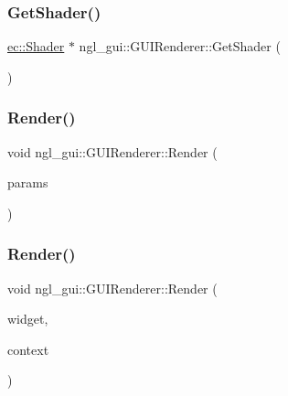 \subsubsection{\texorpdfstring{Get\+Shader()}{GetShader()}}
{\footnotesize\ttfamily \mbox{\hyperlink{classec_1_1_shader}{ec\+::\+Shader}} $\ast$ ngl\+\_\+gui\+::\+G\+U\+I\+Renderer\+::\+Get\+Shader (\begin{DoxyParamCaption}{ }\end{DoxyParamCaption})}

\mbox{\label{classngl__gui_1_1_g_u_i_renderer_a616aa4e5bc587896848b2523686824a7}} 
\subsubsection{\texorpdfstring{Render()}{Render()}\hspace{0.1cm}{\footnotesize\ttfamily [1/5]}}
{\footnotesize\ttfamily void ngl\+\_\+gui\+::\+G\+U\+I\+Renderer\+::\+Render (\begin{DoxyParamCaption}\item[{\mbox{\hyperlink{structngl__gui_1_1_g_u_i_rendering_parameter_list}{G\+U\+I\+Rendering\+Parameter\+List}}}]{params }\end{DoxyParamCaption})}

\mbox{\label{classngl__gui_1_1_g_u_i_renderer_af149928da5c1cb43fb491823a1b264b8}} 
\subsubsection{\texorpdfstring{Render()}{Render()}\hspace{0.1cm}{\footnotesize\ttfamily [2/5]}}
{\footnotesize\ttfamily void ngl\+\_\+gui\+::\+G\+U\+I\+Renderer\+::\+Render (\begin{DoxyParamCaption}\item[{\mbox{\hyperlink{classngl__gui_1_1_widget}{Widget}} $\ast$}]{widget,  }\item[{\mbox{\hyperlink{classngl__gui_1_1_g_u_i_rendering_context}{G\+U\+I\+Rendering\+Context}} \&}]{context }\end{DoxyParamCaption})}

